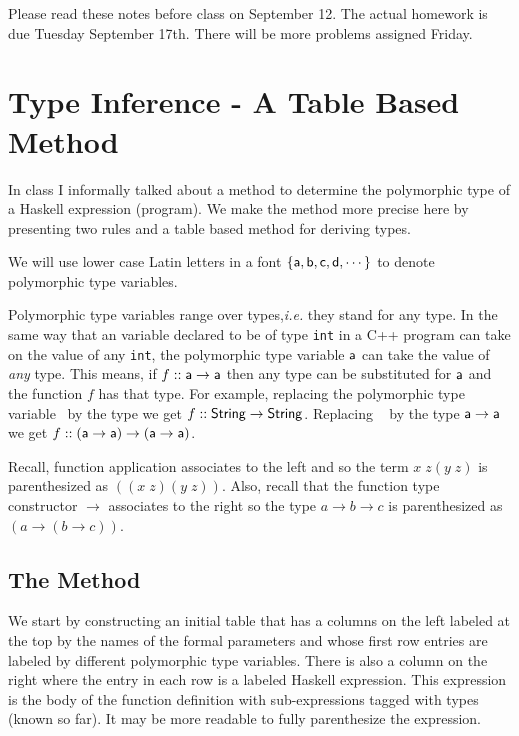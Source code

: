 \documentclass[11pt]{article}
\begin{document}


Please read these notes before class on September 12.  The actual homework is
due Tuesday September 17th. There will be more problems assigned Friday.

\section{Type Inference - A Table Based Method}


In class I informally talked about a method to determine the
polymorphic type of a Haskell expression (program).  We make the
method more precise here by presenting two rules and a table based
method for deriving types.

We will use lower case Latin letters in a {} font
$\{{\sf{a}},{\sf{b}},{\sf{c}},{\sf{d}},\cdots\}$ to denote polymorphic type variables.

Polymorphic type variables range over types,{\em{i.e.}} they stand for
any type.  In the same way that an variable declared to be of type
{\tt{int}} in a C++ program can take on the value of any {\tt{int}},
the polymorphic type variable ${\sf{a}}$ can take the value of {\it{any}}
type.  This means, if $f::{\sf{a}}\rightarrow{\sf{a}}$ then any type can be
substituted for ${\sf{a}}$ and the function $f$ has that type.  For
example, replacing the polymorphic type variable \sfa~by the type
{} we get $f::{\sf{String}}\rightarrow{\sf{String}}$.
Replacing \sfa~ by the type ${\sf{a}}\rightarrow{\sf{a}}$ we get
$f::({\sf{a}}\rightarrow{\sf{a}})\rightarrow({\sf{a}}\rightarrow{\sf{a}})$.

Recall, function application associates to the left and so the term $x\;z
(y\;z)$ is parenthesized as $((x\;z)(y\;z))$. Also, recall that the function
type constructor $\rightarrow$ associates to the right so the type
$a\rightarrow{}b\rightarrow{}c$ is parenthesized as
$(a\rightarrow{}(b\rightarrow{}c))$.


\subsection{The Method}

We start by constructing an initial table that has a columns on the left
labeled at the top by the names of the formal parameters and whose first row
entries are labeled by different polymorphic type variables. There is also a
column on the right where the entry in each row is a labeled Haskell
expression.  This expression is the body of the function definition with
sub-expressions tagged with types (known so far). It may be more readable to
fully parenthesize the expression.
\end{document}
